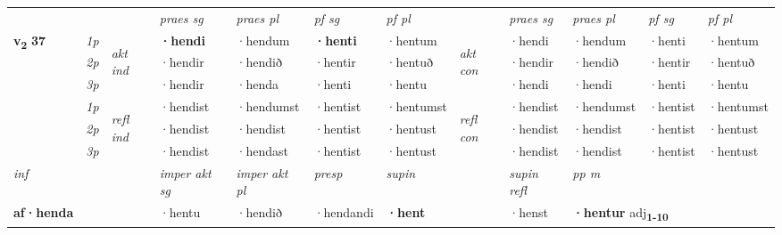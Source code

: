 \begin{longtable}[l]{X>{\footnotesize\itshape}llXXXXlXXXX}
 & &   & \textit{praes sg}  & \textit{praes pl}    & \textit{ pf sg} & \textit{pf pl} & & \textit{praes sg}  & \textit{praes pl}    & \textit{pf sg} & \textit{pf pl }  \\ \cmidrule{4-7} \cmidrule{9-12}
 \multirow{2}{*}{{{\textbf{v{\textsubscript{2}}} \Large{\textbf{37}}}}}  & 1p & \multirow{3}{*}{\begin{turn}{90}\textit{akt ind}\end{turn}} & \textbf{·hendi} & ·hendum & \textbf{·henti} & ·hentum & \multirow{3}{*}{\begin{turn}{90}\textit{akt con}\end{turn}} &·hendi & ·hendum & ·henti & ·hentum\\*
 & 2p &  &  ·hendir  & ·hendið & ·hentir & ·hentuð & & ·hendir & ·hendið & ·hentir & ·hentuð \\*
 & 3p &  & ·hendir & ·henda & ·henti & ·hentu & & ·hendi & ·hendi& ·henti & ·hentu \\*
\cmidrule{4-7} \cmidrule{9-12}
 & 1p & \multirow{3}{*}{\begin{turn}{90}\textit{refl ind}\end{turn}}  & ·hendist & ·hendumst & ·hentist & ·hentumst & \multirow{3}{*}{\begin{turn}{90}\textit{refl con}\end{turn}}  &·hendist & ·hendumst & ·hentist & ·hentumst \\*
 & 2p &  & ·hendist & ·hendist & ·hentist & ·hentust & &·hendist & ·hendist & ·hentist & ·hentust \\*
 & 3p  & & ·hendist & ·hendast & ·hentist & ·hentust & & ·hendist & ·hendist& ·hentist & ·hentust \\*
\cmidrule{4-7} \cmidrule{9-12}

   {\textit{inf}} & &  & \textit{imper akt sg} & \textit{imper akt pl}   & \textit{presp} & \textit{supin} && \textit{supin refl} & \textit{pp m} \\*
  {\textbf{af\allowbreak ·henda}} & && ·hentu  & ·hendið   & ·hendandi &  \textbf{·hent} && ·henst & \multicolumn{2}{l}{\textbf{·hentur} adj\textbf{\textsubscript{1-10}}} \\*

\midrule


\end{longtable}
